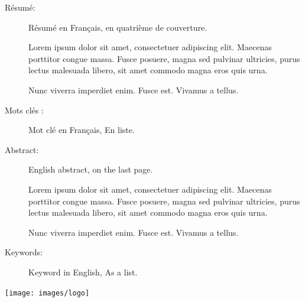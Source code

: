 \documentclass[
  11pt,
  american,
  a4paper,
  extrafontsizes,onecolumn,openright
  ]{memoir}
\begin{document}
\begin{normalsize}

\begin{description}

\item[Résumé:]
Résumé en Français, en quatrième de couverture.

Lorem ipsum dolor sit amet, consectetuer adipiscing elit. Maecenas porttitor congue massa. Fusce posuere, magna sed pulvinar ultricies, purus lectus malesuada libero, sit amet commodo magna eros quis urna.

Nunc viverra imperdiet enim. Fusce est. Vivamus a tellus.

\item[Mots clés :]
Mot clé en Français, En liste.
~\\

\item[Abstract:]
English abstract, on the last page.

Lorem ipsum dolor sit amet, consectetuer adipiscing elit. Maecenas porttitor congue massa. Fusce posuere, magna sed pulvinar ultricies, purus lectus malesuada libero, sit amet commodo magna eros quis urna.

Nunc viverra imperdiet enim. Fusce est. Vivamus a tellus.

\item[Keywords:]
Keyword in English, As a list.

\end{description}

\end{normalsize}

\vspace*{\fill}
\centering\texttt{[image: images/logo]}
\end{document}
